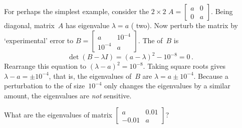 \begin{example} \label{eg:}
For perhaps the simplest example, consider the \(2\times2\)  \(A=\begin{bmatrix} a&0\\0&a \end{bmatrix}\).
Being diagonal, matrix~\(A\) has eigenvalue \(\lambda=a\) ( two).
Now perturb the matrix by `experimental' error to \(B=\begin{bmatrix} a&10^{-4}\\ 10^{-4}&a \end{bmatrix}\).
The  of~\(B\) is
\begin{equation*}
\det(B-\lambda I)=(a-\lambda)^2-10^{-8}=0\,.
\end{equation*}
Rearrange this equation to \((\lambda-a)^2=10^{-8}\).  
Taking square roots gives \(\lambda-a=\pm 10^{-4}\), that is, the eigenvalues of~\(B\) are \(\lambda=a\pm10^{-4}\).
Because a perturbation to the  of size~\(10^{-4}\) only changes the eigenvalues by a similar amount, the eigenvalues are \emph{not} sensitive.
\end{example}





\begin{activity}
What are the eigenvalues of matrix \(\begin{bmatrix} a&0.01\\-0.01&a \end{bmatrix}\)?
\end{activity}





